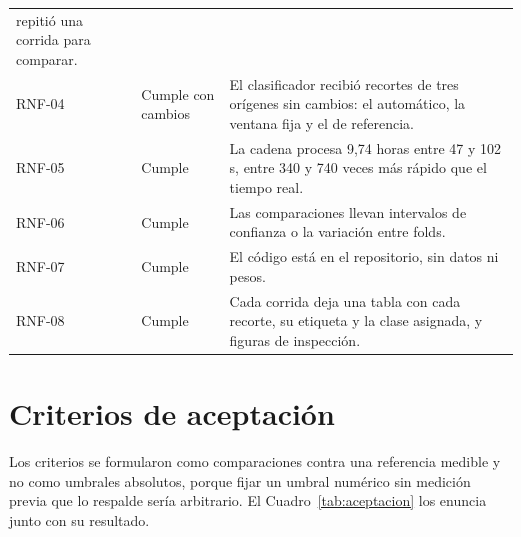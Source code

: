 {\begin{longtable}{>{\raggedright\arraybackslash}p{1.4cm}>{\raggedright\arraybackslash}p{2.2cm}>{\raggedright\arraybackslash}p{8.8cm}}
repitió una corrida para comparar. \\
RNF-04 & Cumple con cambios & El clasificador recibió recortes de tres orígenes
sin cambios: el automático, la ventana fija y el de referencia. \\
RNF-05 & Cumple & La cadena procesa 9,74 horas entre 47 y 102\,s, entre 340 y
740 veces más rápido que el tiempo real. \\
RNF-06 & Cumple & Las comparaciones llevan intervalos de confianza o la
variación entre folds. \\
RNF-07 & Cumple & El código está en el repositorio, sin datos ni pesos. \\
RNF-08 & Cumple & Cada corrida deja una tabla con cada recorte, su etiqueta y
la clase asignada, y figuras de inspección. \\
\end{longtable}
}

\section{Criterios de aceptación}
\label{sec:anexo-aceptacion}

Los criterios se formularon como comparaciones contra una referencia medible y
no como umbrales absolutos, porque fijar un umbral numérico sin medición previa
que lo respalde sería arbitrario. El Cuadro~\ref{tab:aceptacion} los enuncia
junto con su resultado.

